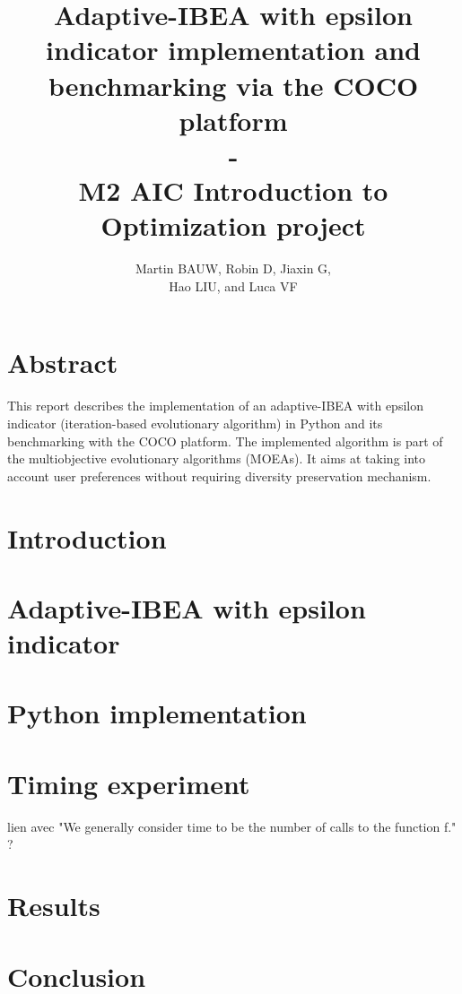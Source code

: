 \documentclass[12pt]{article}
\date{}
\begin{document}
\title{Adaptive-IBEA with epsilon indicator implementation and benchmarking via the COCO platform \\ \-- \\ M2 AIC Introduction to Optimization project}
\author{Martin BAUW, Robin D, Jiaxin G,\\ Hao LIU, and Luca VF}
\maketitle

\tableofcontents

\newpage

\section{Abstract}

This report describes the implementation of an adaptive-IBEA with epsilon indicator (iteration-based evolutionary algorithm) in Python and its benchmarking with the COCO platform. The implemented algorithm is part of the multiobjective evolutionary algorithms (MOEAs). It aims at taking into account user preferences without requiring diversity preservation mechanism.

\section{Introduction}

\section{Adaptive-IBEA with epsilon indicator}

\section{Python implementation}

\section{Timing experiment}
lien avec "We generally consider time to be the number of calls to the function f." ?

\section{Results}

\section{Conclusion}
\end{document}
